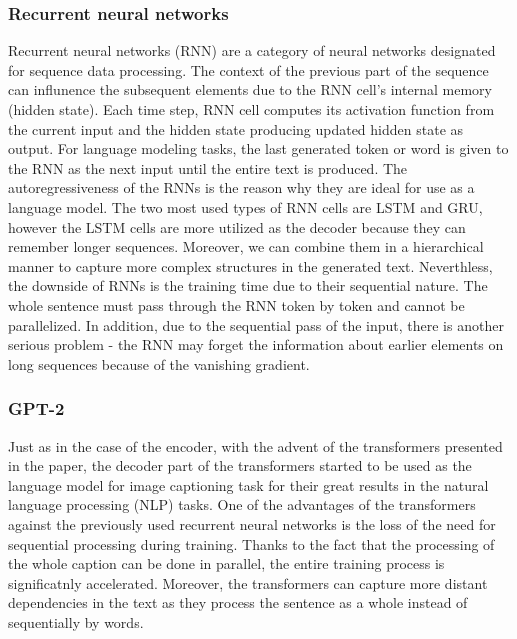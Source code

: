\subsubsection{Recurrent neural networks}
Recurrent neural networks (RNN)\citep{rumelhart1985learning} are a category of neural networks designated for sequence data processing. The context of the previous part of the sequence can influnence the subsequent elements due to the RNN cell's internal memory (hidden state). Each time step, RNN cell computes its activation function from the current input and the hidden state producing updated hidden state as output. For language modeling tasks, the last generated token or word is given to the RNN as the next input until the entire text is produced. The autoregressiveness of the RNNs is the reason why they are ideal for use as a language model. The two most used types of RNN cells are LSTM\citep{hochreiter1997long} and GRU\citep{cho2014learning}, however the LSTM cells are more utilized as the decoder because they can remember longer sequences. Moreover, we can combine them in a hierarchical manner to capture more complex structures in the generated text. Neverthless, the downside of RNNs is the training time due to their sequential nature. The whole sentence must pass through the RNN token by token and cannot be parallelized. In addition, due to the sequential pass of the input, there is another serious problem - the RNN may forget the information about earlier elements on long sequences because of the vanishing gradient.

\subsubsection{GPT-2}
Just as in the case of the encoder, with the advent of the transformers presented in the \citet{vaswani2017attention} paper, the decoder part of the transformers started to be used as the language model for image captioning task for their great results in the natural language processing (NLP) tasks. One of the advantages of the transformers against the previously used recurrent neural networks is the loss of the need for sequential processing during training. Thanks to the fact that the processing of the whole caption can be done in parallel, the entire training process is significatnly accelerated. Moreover, the transformers can capture more distant dependencies in the text as they process the sentence as a whole instead of sequentially by words.\\

